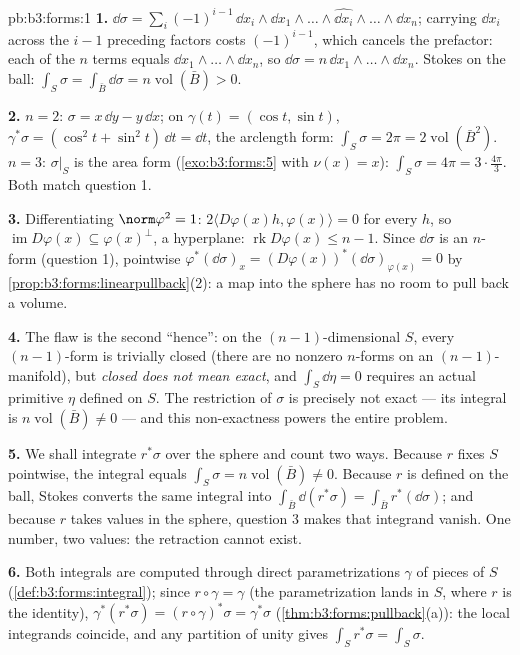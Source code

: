 \begin{solution}{pb:b3:forms:1}
\textbf{1.} $\dd\sigma = \sum_i(-1)^{i-1}\,\dd x_i\wedge\dd
x_1\wedge\dots\wedge\widehat{\dd x_i}\wedge\dots\wedge\dd
x_n$; carrying $\dd x_i$ across the $i-1$ preceding factors
costs $(-1)^{i-1}$, which cancels the prefactor: each of the
$n$ terms equals $\dd x_1\wedge\dots\wedge\dd x_n$, so
$\dd\sigma = n\,\dd x_1\wedge\dots\wedge\dd x_n$. Stokes on
the ball: $\int_S\sigma = \int_{\bar B}\dd\sigma =
n\operatorname{vol}(\bar B) > 0$.

\textbf{2.} $n = 2$: $\sigma = x\,\dd y - y\,\dd x$; on
$\gamma(t) = (\cos t, \sin t)$, $\gamma^*\sigma = (\cos^2t +
\sin^2t)\,\dd t = \dd t$, the arclength form:
$\int_S\sigma = 2\pi = 2\operatorname{vol}(\bar B^2)$.
$n = 3$: $\sigma\vert_S$ is the area form
(\cref{exo:b3:forms:5} with $\nu(x) = x$):
$\int_S\sigma = 4\pi = 3\cdot\tfrac{4\pi}3$. Both match
question 1.

\textbf{3.} Differentiating $\norm\varphi^2 = 1$: $2\langle
D\varphi(x)h, \varphi(x)\rangle = 0$ for every $h$, so
$\operatorname{im}D\varphi(x) \subseteq \varphi(x)^\perp$, a
hyperplane: $\operatorname{rk}D\varphi(x) \leq n - 1$. Since
$\dd\sigma$ is an $n$-form (question 1), pointwise
$\varphi^*(\dd\sigma)_x =
(D\varphi(x))^*(\dd\sigma)_{\varphi(x)} = 0$ by
\cref{prop:b3:forms:linearpullback}(2): a map into the
sphere has no room to pull back a volume.

\textbf{4.} The flaw is the second ``hence'': on the
$(n-1)$-dimensional $S$, every $(n-1)$-form is trivially
closed (there are no nonzero $n$-forms on an
$(n-1)$-manifold), but \emph{closed does not mean exact},
and $\int_S\dd\eta = 0$ requires an actual primitive $\eta$
defined on $S$. The restriction of $\sigma$ is precisely not
exact --- its integral is $n\operatorname{vol}(\bar B) \neq
0$ --- and this non-exactness powers the entire problem.

\textbf{5.} We shall integrate $r^*\sigma$ over the sphere
and count two ways. Because $r$ fixes $S$ pointwise, the
integral equals $\int_S\sigma = n\operatorname{vol}(\bar B)
\neq 0$. Because $r$ is defined on the ball, Stokes converts
the same integral into $\int_{\bar B}\dd(r^*\sigma) =
\int_{\bar B}r^*(\dd\sigma)$; and because $r$ takes values
in the sphere, question 3 makes that integrand vanish. One
number, two values: the retraction cannot exist.

\textbf{6.} Both integrals are computed through direct
parametrizations $\gamma$ of pieces of $S$
(\cref{def:b3:forms:integral}); since $r\circ\gamma =
\gamma$ (the parametrization lands in $S$, where $r$ is the
identity), $\gamma^*(r^*\sigma) = (r\circ\gamma)^*\sigma =
\gamma^*\sigma$ (\cref{thm:b3:forms:pullback}(a)): the local
integrands coincide, and any partition of unity gives
$\int_Sr^*\sigma = \int_S\sigma$.


\end{solution}
